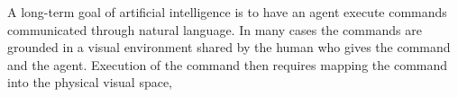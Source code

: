 A long-term goal of artificial intelligence is to have an agent execute commands communicated through natural language.
In many cases the commands are grounded in a visual environment shared by the human who gives the command and the agent. Execution of the command then requires mapping the command into the physical visual space,